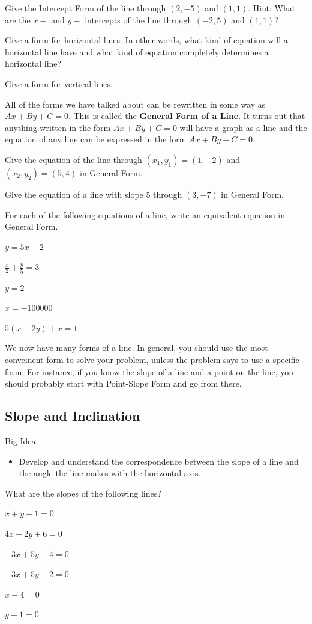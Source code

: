\bq Give the Intercept Form of the line through $(2,-5)$ and $(1,1)$. Hint: What are the $x-$ and $y-$ intercepts of the line through $(-2,5)$ and $(1,1)$?
\eq

\bq Give a form for horizontal lines. In other words, what kind of equation will a horizontal line have and what kind of equation completely determines a horizontal line?
\eq

\bq\label{q15} Give a form for vertical lines.
\eq

\begin{info} All of the forms we have talked about can be rewritten in some way as $ Ax+By+C=0$. This is called the \textbf{General Form of a Line}. It turns out that anything written in the form $ Ax+By+C=0$ will have a graph as a line and the equation of any line can be expressed in the form $ Ax+By+C=0$.  \end{info}

\question Give the equation of the line through $(x_1,y_1)=(1,-2)$ and $(x_2,y_2) = (5,4)$ in General Form.

\question Give the equation of a line with slope 5 through $(3,-7)$ in General Form.

\bq For each of the following equations of a line, write an equivalent equation in General Form.
\be
\item $y=5x-2$
\item $ \frac{x}{2}+\frac{y}{5}=3$
\item $y=2$
\item $x=-100000$
\item $5(x-2y)+x=1$
\ee
\eq

We now have many forms of a line. In general, you should use the most conveinent form to solve your problem, unless the problem says to use a specific form. For instance, if you know the slope of a line and a point on the line, you should probably start with Point-Slope Form and go from there.
\subsection{Slope and Inclination}
Big Idea:
\begin{itemize}
\item Develop and understand the correspondence between the slope of a line and the angle the line makes with the horizontal axis.
\end{itemize}
\bq What are the slopes of the following lines?
\be
\item $x+y+1=0$
\item $4x-2y+6=0$
\item $-3x+5y-4=0$
\item $-3x+5y+2=0$
\item $x-4=0$
\item $y+1=0$
\ee
\eq

